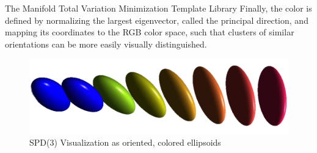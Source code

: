 \begin{chapter}{The Manifold Total Variation Minimization Template Library}
Finally, the color is defined by normalizing the largest eigenvector, called the principal direction, and mapping its coordinates to the RGB color space, such that clusters of
similar orientations can be more easily visually distinguished.

\begin{figure}[h!]
        \centering
	    \includegraphics[width=0.8\linewidth]{./figures/library/ellipsoids.pdf}
	    \caption[SPD(3) ellipsoid visualization]{SPD(3) Visualization as oriented, colored ellipsoids}
	\label{fig:ellipsoid_visualization}
\end{figure}


\end{chapter}
